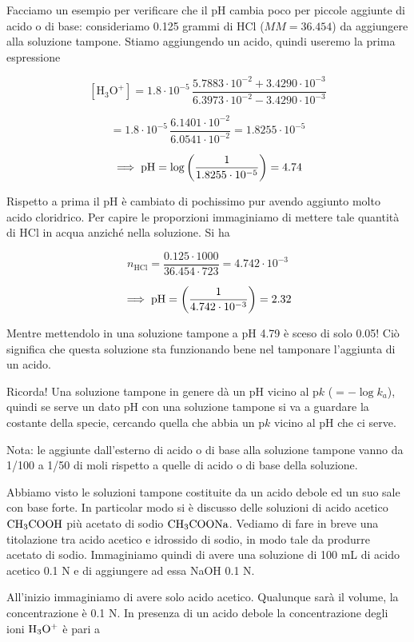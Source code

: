 Facciamo un esempio per verificare che il pH cambia poco per piccole aggiunte di acido o di base: consideriamo 0.125 grammi di HCl ($MM=36.454$) da aggiungere alla soluzione tampone. Stiamo aggiungendo un acido, quindi useremo la prima espressione

$${[\text{H}_3\text{O}^+]}=1.8 \cdot 10^{-5}\,\frac{5.7883 \cdot 10^{-2} + 3.4290\cdot 10^{-3}}{6.3973 \cdot 10^{-2} - 3.4290 \cdot 10^{-3}}$$

$$=1.8 \cdot 10^{-5}\,\frac{6.1401 \cdot 10^{-2}}{6.0541 \cdot 10^{-2}}
=1.8255 \cdot 10^{-5}$$

$$\implies \rm pH=\log \left( \frac{1}{1.8255 \cdot 10^{-5}} \right)=4.74$$

Rispetto a prima il pH è cambiato di pochissimo pur avendo aggiunto molto acido cloridrico. Per capire le proporzioni immaginiamo di mettere tale quantità di HCl in acqua anziché nella soluzione. Si ha 

$$n_{\text{HCl}}=\frac{0.125 \cdot 1000}{36.454 \cdot 723}
=4.742 \cdot 10^{-3}$$

$$\implies \rm pH=\left( \frac{1}{4.742 \cdot 10^{-3}} \right)=2.32$$

Mentre mettendolo in una soluzione tampone a pH 4.79 è sceso di solo 0.05! Ciò significa che questa soluzione sta funzionando bene nel tamponare l'aggiunta di un acido.

\vspace{0.2cm}Ricorda! Una soluzione tampone in genere dà un pH vicino al p$k$ ($=-\log{k_a}$), quindi se serve un dato pH con una soluzione tampone si va a guardare la costante della specie, cercando quella che abbia un p$k$ vicino al pH che ci serve.

Nota: le aggiunte dall'esterno di acido o di base alla soluzione tampone vanno da 1/100 a 1/50 di moli rispetto a quelle di acido o di base della soluzione.

\vspace{0.4cm}Abbiamo visto le soluzioni tampone costituite da un acido debole ed un suo sale con base forte. In particolar modo si è discusso delle soluzioni di acido acetico $\rm CH_3COOH$ più acetato di sodio $\rm CH_3COONa$. Vediamo di fare in breve una titolazione tra acido acetico e idrossido di sodio, in modo tale da produrre acetato di sodio. Immaginiamo quindi di avere una soluzione di 100 mL di acido acetico 0.1 N e di aggiungere ad essa NaOH 0.1 N.

All'inizio immaginiamo di avere solo acido acetico. Qualunque sarà il volume, la concentrazione è 0.1 N. In presenza di un acido debole la concentrazione degli ioni $\rm H_3O^+$ è pari a


